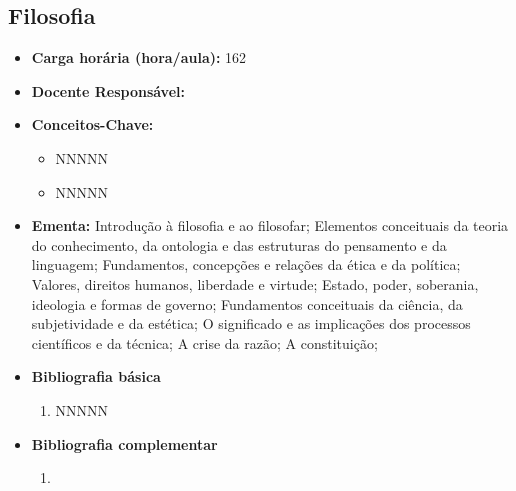 \documentclass[11pt,fleqn]{book} %
\begin{document}
\subsection{Filosofia}\label{disc:filosofia}
\begin{itemize}
	\item \textbf{Carga horária (hora/aula):} 162
	\item \textbf{Docente Responsável:}
	\item \textbf{Conceitos-Chave:}
	\begin{itemize}
		\item NNNNN
		\item NNNNN
	\end{itemize}
	\item \textbf{Ementa:} Introdução à filosofia e ao filosofar;
	Elementos conceituais da teoria do conhecimento, da ontologia e das estruturas do pensamento e da linguagem;
	Fundamentos, concepções e relações da ética e da política; 
	Valores, direitos humanos, liberdade e virtude;
	Estado, poder, soberania, ideologia e formas de governo;
	Fundamentos conceituais da ciência, da subjetividade e da estética;
	O significado e as implicações dos processos científicos e da técnica; 
	A crise da razão;
	A constituição;
	\item \textbf{Bibliografia básica}
	\begin{enumerate}
		\item NNNNN
	\end{enumerate}
	\item \textbf{Bibliografia complementar}
	\begin{enumerate}
		\item 
	\end{enumerate}	
\end{itemize}



\newpage
\end{document}
